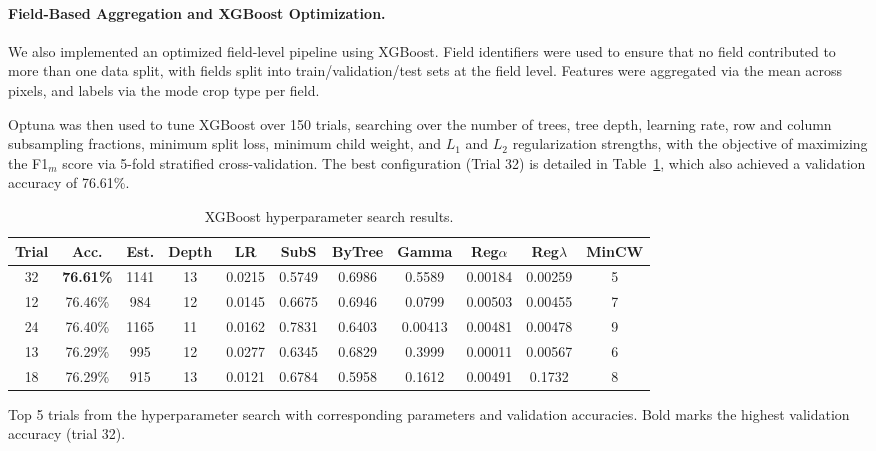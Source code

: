 \documentclass[pdflatex,sn-mathphys]{sn-jnl} %
\begin{document}
\paragraph{Field-Based Aggregation and XGBoost Optimization.}
    We also implemented an optimized field-level pipeline using XGBoost. Field identifiers were used to ensure that no field contributed to more than one data split, with fields split into train/validation/test sets at the field level. Features were aggregated via the mean across pixels, and labels via the mode crop type per field.

Optuna was then used to tune XGBoost over 150 trials, searching over the number of trees, tree depth, learning rate, row and column subsampling fractions, minimum split loss, minimum child weight, and $L_1$ and $L_2$ regularization strengths, with the objective of maximizing the F1$_m$ score via 5-fold stratified cross-validation. The best configuration (Trial 32) is detailed in Table~\ref{tab:top5_trials}, which also achieved a validation accuracy of 76.61\%.

\begin{table}[htbp]
\centering
\scriptsize %
\caption{XGBoost hyperparameter search results.}
\label{tab:top5_trials}
\renewcommand{\arraystretch}{1.1}
\setlength{\tabcolsep}{3pt} %
\begin{tabular}{ccccccccccc}
\toprule
\textbf{Trial} & \textbf{Acc.} & \textbf{Est.} & \textbf{Depth} & \textbf{LR} & \textbf{SubS} & \textbf{ByTree} & \textbf{Gamma} & \textbf{Reg$\alpha$} & \textbf{Reg$\lambda$} & \textbf{MinCW} \\
\midrule
32 & \textbf{76.61\%} & 1141 & 13 & 0.0215 & 0.5749 & 0.6986 & 0.5589 & 0.00184 & 0.00259 & 5 \\
12 & 76.46\% & 984  & 12 & 0.0145 & 0.6675 & 0.6946 & 0.0799 & 0.00503 & 0.00455 & 7 \\
24 & 76.40\% & 1165 & 11 & 0.0162 & 0.7831 & 0.6403 & 0.00413 & 0.00481 & 0.00478 & 9 \\
13 & 76.29\% & 995  & 12 & 0.0277 & 0.6345 & 0.6829 & 0.3999 & 0.00011 & 0.00567 & 6 \\
18 & 76.29\% & 915  & 13 & 0.0121 & 0.6784 & 0.5958 & 0.1612 & 0.00491 & 0.1732 & 8 \\
\bottomrule
\end{tabular}

\par\vspace{4pt}
{\footnotesize Top 5 trials from the hyperparameter search with corresponding parameters and
validation accuracies. Bold marks the highest validation accuracy (trial 32).\par}
\end{table}
\end{document}
